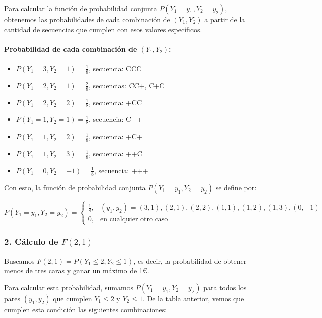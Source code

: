 \documentclass[
]{article}
\providecommand{\tightlist}{%
  \setlength{\itemsep}{0pt}\setlength{\parskip}{0pt}}
\begin{document}
Para calcular la función de probabilidad conjunta \(P(Y_1 = y_1, Y_2 = y_2)\), obtenemos las probabilidades de cada combinación de \((Y_1, Y_2)\) a partir de la cantidad de secuencias que cumplen con esos valores específicos.

\paragraph{\texorpdfstring{Probabilidad de cada combinación de \((Y_1, Y_2)\):}{Probabilidad de cada combinación de (Y\_1, Y\_2):}}\label{probabilidad-de-cada-combinaciuxf3n-de-y_1-y_2}

\begin{itemize}
\tightlist
\item
  \(P(Y_1 = 3, Y_2 = 1) = \frac{1}{8}\), secuencia: CCC
\item
  \(P(Y_1 = 2, Y_2 = 1) = \frac{2}{8}\), secuencias: CC+, C+C
\item
  \(P(Y_1 = 2, Y_2 = 2) = \frac{1}{8}\), secuencia: +CC
\item
  \(P(Y_1 = 1, Y_2 = 1) = \frac{1}{8}\), secuencia: C++
\item
  \(P(Y_1 = 1, Y_2 = 2) = \frac{1}{8}\), secuencia: +C+
\item
  \(P(Y_1 = 1, Y_2 = 3) = \frac{1}{8}\), secuencia: ++C
\item
  \(P(Y_1 = 0, Y_2 = -1) = \frac{1}{8}\), secuencia: +++
\end{itemize}

Con esto, la función de probabilidad conjunta \(P(Y_1 = y_1, Y_2 = y_2)\) se define por:

\[
P(Y_1 = y_1, Y_2 = y_2) = 
\begin{cases}
\frac{1}{8}, & (y_1, y_2) = (3, 1), (2, 1), (2, 2), (1, 1), (1, 2), (1, 3), (0, -1) \\
0, & \text{en cualquier otro caso}
\end{cases}
\]

\subsubsection{\texorpdfstring{2. Cálculo de \(F(2, 1)\)}{2. Cálculo de F(2, 1)}}\label{cuxe1lculo-de-f2-1}

Buscamos \(F(2, 1) = P(Y_1 \leq 2, Y_2 \leq 1)\), es decir, la probabilidad de obtener menos de tres caras y ganar un máximo de 1€.

Para calcular esta probabilidad, sumamos \(P(Y_1 = y_1, Y_2 = y_2)\) para todos los pares \((y_1, y_2)\) que cumplen \(Y_1 \leq 2\) y \(Y_2 \leq 1\). De la tabla anterior, vemos que cumplen esta condición las siguientes combinaciones:
\end{document}
